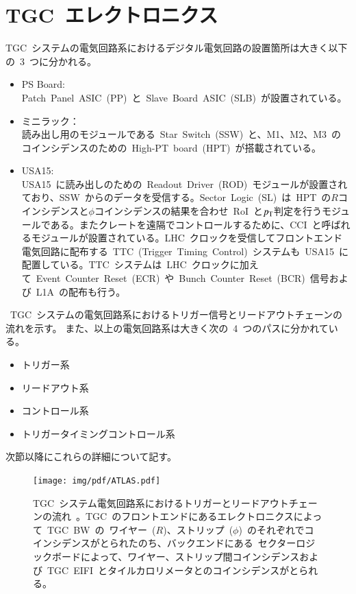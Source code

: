\section{TGC~エレクトロニクス}
TGC~システムの電気回路系におけるデジタル電気回路の設置箇所は大きく以下の~3~つに分かれる。
\begin{itemize}
    \item PS Board: \\
    Patch~Panel~ASIC~(PP)~と~Slave~Board~ASIC~(SLB)~が設置されている。
    \item ミニラック：\\
    読み出し用のモジュールである~Star~Switch~(SSW)~と、M1、M2、M3~のコインシデンスのための~High-PT~board~(HPT)~が搭載されている。
    \item USA15: \\
    USA15~に読み出しのための~Readout~Driver~(ROD)~モジュールが設置されており、SSW~からのデータを受信する。Sector~Logic~(SL)~は~HPT~の$R$コインシデンスと$\phi$コインシデンスの結果を合わせ~RoI~と$p_{\rm{T}}$判定を行うモジュールである。またクレートを遠隔でコントロールするために、CCI~と呼ばれるモジュールが設置されている。LHC~クロックを受信してフロントエンド電気回路に配布する~TTC~(Trigger~Timing~Control)~システムも~USA15~に配置している。TTC~システムは~LHC~クロックに加えて~Event~Counter~Reset~(ECR)~や~Bunch~Counter~Reset~(BCR)~信号および~L1A~の配布も行う。
\end{itemize}
~TGC~システムの電気回路系におけるトリガー信号とリードアウトチェーンの流れを示す。
また、以上の電気回路系は大きく次の~4~つのパスに分かれている。
\begin{itemize}
    \item トリガー系
    \item リードアウト系
    \item コントロール系
    \item トリガータイミングコントロール系
\end{itemize}
次節以降にこれらの詳細について記す。

\begin{figure}[H]
        \centering   
        \texttt{[image: img/pdf/ATLAS.pdf]}
        \caption[TGC システム電気回路系におけるトリガーとリードアウトチェーンの流れ]{TGC~システム電気回路系におけるトリガーとリードアウトチェーンの流れ~\cite{TR:01}。TGC~のフロントエンドにあるエレクトロニクスによって~TGC~BW~の~ワイヤー~($R$)、ストリップ~($\phi$)~のそれぞれでコインシデンスがとられたのち、バックエンドにある~セクターロジックボードによって、ワイヤー、ストリップ間コインシデンスおよび~TGC~EIFI~とタイルカロリメータとのコインシデンスがとられる。}
        \label{fig:tgcelec}
\end{figure}

